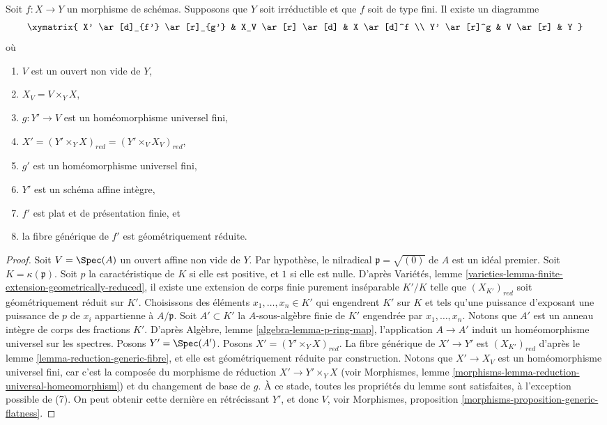 \begin{lemma}
\label{lemma-make-generic-fibre-geometrically-reduced}
Soit $f : X \to Y$ un morphisme de schémas.
Supposons que $Y$ soit irréductible et que $f$ soit de type fini.
Il existe un diagramme
$$
\xymatrix{
X' \ar[d]_{f'} \ar[r]_{g'} & X_V \ar[r] \ar[d] & X \ar[d]^f \\
Y' \ar[r]^g & V \ar[r] & Y
}
$$
où
\begin{enumerate}
\item $V$ est un ouvert non vide de $Y$,
\item $X_V = V \times_Y X$,
\item $g : Y' \to V$ est un homéomorphisme universel fini,
\item $X' = (Y' \times_Y X)_{red} = (Y' \times_V X_V)_{red}$,
\item $g'$ est un homéomorphisme universel fini,
\item $Y'$ est un schéma affine intègre,
\item $f'$ est plat et de présentation finie, et
\item la fibre générique de $f'$ est géométriquement réduite.
\end{enumerate}
\end{lemma}

\begin{proof}
Soit $V = \Spec(A)$ un ouvert affine non vide de $Y$.
Par hypothèse, le nilradical $\mathfrak p = \sqrt{(0)}$ de $A$
est un idéal premier.
Soit $K = \kappa(\mathfrak p)$.
Soit $p$ la caractéristique de $K$ si elle est positive, et $1$
si elle est nulle. D'après
Variétés, lemme \ref{varieties-lemma-finite-extension-geometrically-reduced},
il existe une extension de corps finie purement inséparable
$K'/K$ telle que $(X_{K'})_{red}$ soit géométriquement réduit sur $K'$.
Choisissons des éléments $x_1, \ldots, x_n \in K'$ qui engendrent $K'$ sur
$K$ et tels qu'une puissance d'exposant une puissance de $p$ de $x_i$ appartienne à $A/\mathfrak p$.
Soit $A' \subset K'$ la $A$-sous-algèbre finie de $K'$ engendrée par
$x_1, \ldots, x_n$. Notons que $A'$ est un anneau intègre de corps des fractions $K'$. D'après
Algèbre, lemme \ref{algebra-lemma-p-ring-map},
l'application $A \to A'$ induit un homéomorphisme universel sur les spectres.
Posons $Y' = \Spec(A')$. Posons $X' = (Y' \times_Y X)_{red}$.
La fibre générique de $X' \to Y'$ est $(X_{K'})_{red}$ d'après le
lemme \ref{lemma-reduction-generic-fibre},
et elle est géométriquement réduite par construction.
Notons que $X' \to X_V$ est un homéomorphisme universel fini, car c'est la
composée du morphisme de réduction $X' \to Y' \times_Y X$ (voir
Morphismes, lemme \ref{morphisms-lemma-reduction-universal-homeomorphism})
et du changement de base de $g$.
À ce stade, toutes les propriétés du lemme sont satisfaites, à l'exception
possible de (7). On peut obtenir cette dernière en rétrécissant $Y'$, et donc $V$, voir
Morphismes, proposition \ref{morphisms-proposition-generic-flatness}.
\end{proof}

